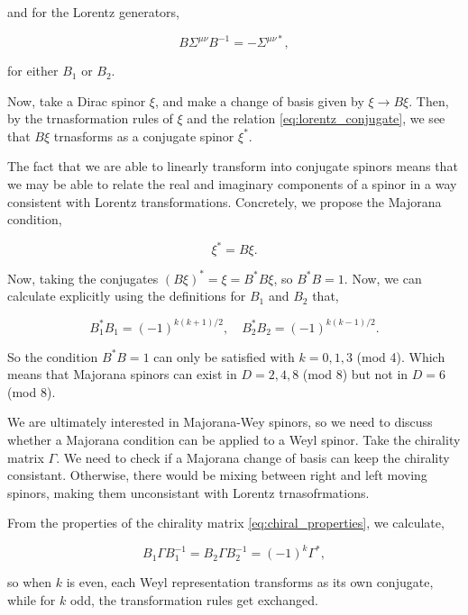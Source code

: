 and for the Lorentz generators,

\begin{equation}
    \label{eq:lorentz_conjugate}
    B\Sigma^{\mu\nu}B^{-1}=-\Sigma^{\mu\nu*},
\end{equation}

for either $B_1$ or $B_2$.

Now, take a Dirac spinor $\xi$, and make a change of basis given by $\xi \rightarrow B\xi$. Then, by the trnasformation rules of $\xi$ and the relation \ref{eq:lorentz_conjugate}, we see that $B\xi$ trnasforms as a conjugate spinor $\xi^*$.

The fact that we are able to linearly transform into conjugate spinors means that we may be able to relate the real and imaginary components of a spinor in a way consistent with Lorentz transformations. Concretely, we propose the Majorana condition,

\begin{equation}
    \xi^* = B\xi.
\end{equation}

Now, taking the conjugates $(B\xi)^* = \xi = B^*B\xi$, so $B^* B = 1$. Now, we can calculate explicitly using the definitions for $B_1$ and $B_2$ that,

\begin{equation}
    B_1^*B_1=(-1)^{k(k+1)/2},\quad B_2^*B_2=(-1)^{k(k-1)/2}.
\end{equation}

So the condition $B^* B = 1$ can only be satisfied with $k = 0, 1, 3$ (mod 4). Which means that Majorana spinors can exist in $D = 2, 4, 8$ (mod 8) but not in $D = 6$ (mod 8).

We are ultimately interested in Majorana-Wey spinors, so we need to discuss whether a Majorana condition can be applied to a Weyl spinor. Take the chirality matrix $\Gamma$. We need to check if a Majorana change of basis can keep the chirality consistant. Otherwise, there would be mixing between right and left moving spinors, making them unconsistant with Lorentz trnasofrmations.

From the properties of the chirality matrix \ref{eq:chiral_properties}, we calculate,

\begin{equation}
    B_1\Gamma B_1^{-1}=B_2\Gamma B_2^{-1}=(-1)^k\Gamma^*,
\end{equation}

so when $k$ is even, each Weyl representation transforms as its own conjugate, while for $k$ odd, the transformation rules get exchanged.

